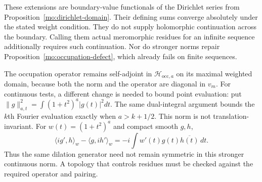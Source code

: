 These extensions are boundary-value functionals of the Dirichlet
series from Proposition~\ref{mo:dirichlet-domain}. Their defining sums converge
absolutely under the stated weight condition. They do not supply
holomorphic continuation across the boundary. Calling them actual
meromorphic residues for an infinite sequence additionally requires
such continuation. Nor do stronger norms repair
Proposition~\ref{mo:occupation-defect}, which already fails on finite sequences.

The occupation operator remains self-adjoint in
$\mathscr H_{\mathrm{occ},a}$ on its maximal weighted domain,
because both the norm and the operator are diagonal in $v_m$.
For continuous tests, a different change is needed to bound point
evaluation: put $\|g\|_{a,t}^2=\int(1+t^2)^a|g(t)|^2dt$.
The same dual-integral argument bounds the $k$th Fourier evaluation
exactly when $a>k+1/2$. This norm is not translation-invariant.
For $w(t)=(1+t^2)^a$ and compact smooth $g,h$,
\[
 \langle i g',h\rangle_w-\langle g,i h'\rangle_w
 =-i\int w'(t)g(t)\overline{h(t)}\,dt.
\]
Thus the same dilation generator need not remain symmetric in
this stronger continuous norm. A topology that controls residues
must be checked against the required operator and pairing.

